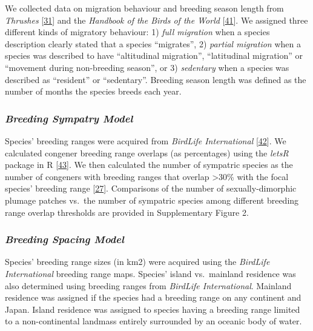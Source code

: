 \documentclass[
  a4paper,
]{article}
\begin{document}
We collected data on migration behaviour and breeding season length from
\emph{Thrushes} {[}\protect\hyperlink{ref-clement2000}{31}{]} and the
\emph{Handbook of the Birds of the World}
{[}\protect\hyperlink{ref-delhoyo2017}{41}{]}⁠. We assigned three
different kinds of migratory behaviour: 1) \emph{full migration} when a
species description clearly stated that a species ``migrates'', 2)
\emph{partial migration} when a species was described to have
``altitudinal migration'', ``latitudinal migration'' or ``movement
during non-breeding season'', or 3) \emph{sedentary} when a species was
described as ``resident'' or ``sedentary''. Breeding season length was
defined as the number of months the species breeds each year.

\hypertarget{breeding-sympatry-model}{%
\subsubsection{\texorpdfstring{\emph{Breeding Sympatry
Model}}{Breeding Sympatry Model}}\label{breeding-sympatry-model}}

Species' breeding ranges were acquired from \emph{BirdLife
International}
{[}\protect\hyperlink{ref-birdlifeinternationalandhandbookofthebirdsoftheworld2018}{42}{]}⁠.
We calculated congener breeding range overlaps (as percentages) using
the \emph{letsR} package in R
{[}\protect\hyperlink{ref-vilela2015}{43}{]}⁠. We then calculated the
number of sympatric species as the number of congeners with breeding
ranges that overlap \textgreater30\% with the focal species' breeding
range {[}\protect\hyperlink{ref-cooney2017}{27}{]}. Comparisons of the
number of sexually-dimorphic plumage patches vs.~the number of sympatric
species among different breeding range overlap thresholds are provided
in Supplementary Figure 2.

\hypertarget{breeding-spacing-model}{%
\subsubsection{\texorpdfstring{\emph{Breeding Spacing
Model}}{Breeding Spacing Model}}\label{breeding-spacing-model}}

Species' breeding range sizes (in km2) were acquired using the
\emph{BirdLife International} breeding range maps. Species' island
vs.~mainland residence was also determined using breeding ranges from
\emph{BirdLife International}. Mainland residence was assigned if the
species had a breeding range on any continent and Japan. Island
residence was assigned to species having a breeding range limited to a
non-continental landmass entirely surrounded by an oceanic body of
water.
\end{document}

